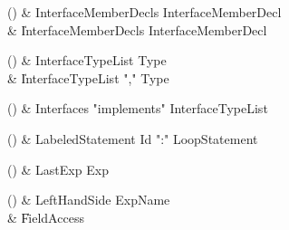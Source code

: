 \begin{bbgrammarappendix}

() & InterfaceMemberDecls \label{prod:InterfaceMemberDecls}  \: InterfaceMemberDecl  \\

 &    \| InterfaceMemberDecls InterfaceMemberDecl \\

\end{bbgrammarappendix}

\begin{bbgrammarappendix}

() & InterfaceTypeList \label{prod:InterfaceTypeList}  \: Type  \\

 &    \| InterfaceTypeList \xcd"," Type \\

\end{bbgrammarappendix}

\begin{bbgrammarappendix}

() & Interfaces \label{prod:Interfaces}  \: \xcd"implements" InterfaceTypeList  \\


\end{bbgrammarappendix}

\begin{bbgrammarappendix}

() & LabeledStatement \label{prod:LabeledStatement}  \: Id \xcd":" LoopStatement  \\


\end{bbgrammarappendix}

\begin{bbgrammarappendix}

() & LastExp \label{prod:LastExp}  \: Exp  \\


\end{bbgrammarappendix}

\begin{bbgrammarappendix}

() & LeftHandSide \label{prod:LeftHandSide}  \: ExpName  \\

 &    \| FieldAccess \\

\end{bbgrammarappendix}

